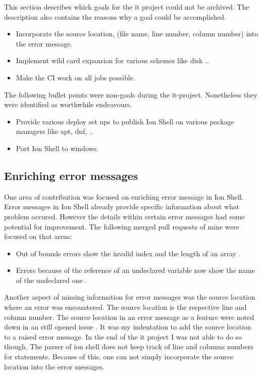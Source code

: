 This section describes which goals for the it project could not be archived.
The description also contains the reasons why a goal could be accomplished.

\begin{itemize}
	\item Incorporate the source location, (file name, line number, column number) into the error message.
	\item Implement wild card expansion for various schemes like disk ..
	\item Make the CI work on all jobs possible.
\end{itemize}

The following bullet points were non-goals during the it-project. Nonetheless they were identified as worthwhile endeavours.

\begin{itemize}
	\item Provide various deploy set ups to publish Ion Shell on various package managers like apt, dnf, ..
	\item Port Ion Shell to windows.
\end{itemize}

\subsection{Enriching error messages}

One area of contribution was focused on enriching error message in Ion Shell.
Error messages in Ion Shell already provide specific information about what problem occured.
However the details within certain error messages had some potential for improvement.
The following merged pull requests of mine were focused on that areas:

\begin{itemize}
	\item Out of bounds errors show the invalid index and the length of an array \cite{pr_error_message_shows_invalid_range}.
	\item Errors because of the reference of an undeclared variable now show the name of the undeclared one \cite{pr_better_not_found_variable_show}.
\end{itemize}

Another aspect of missing information for error messages was the source location where an error was encountered.
The source location is the respective line and column number.
The source location in an error message as a feature were noted down in an still opened issue \cite{issue_enrich_error_message_information} .
It was my indentation to add the source location to a raised error message.
In the end of the it project I was not able to do so though.
The parser of ion shell does not keep track of line and columns numbers for statements.
Because of this, one can not simply incorporate the source location into the error messages.

